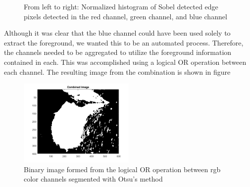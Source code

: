 \documentclass{article}[12 pt]
\begin{document}
\begin{figure}[H]
\captionsetup[subfloat]{labelformat=empty}
\centering
{} 
\caption{From left to right: Normalized histogram of Sobel detected edge pixels detected in the red channel, green channel, and blue channel}
\label{otsu}
\end{figure}

\noindent
Although it was clear that the blue channel could have been used solely to extract the foreground, we wanted this to be an automated process.  Therefore, the channels needed to be aggregated to utilize the foreground information contained in each.  This was accomplished using a logical OR operation between each channel.  The resulting image from  the combination is shown in figure 


\begin{center}
	\begin{figure}[H]
		\centering
		\includegraphics[width = 0.5\textwidth]{Images/combinedImage.png}
		\caption{Binary image formed from the logical OR operation between rgb color channels segmented with Otsu's method}
		\label{scene}
	\end{figure}
\end{center}
\end{document}
